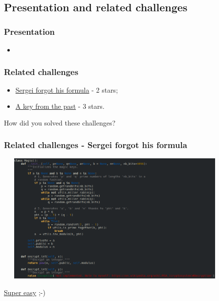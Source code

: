 \documentclass[]{beamer}
\begin{document}
\subsection{Presentation and related challenges}
\begin{frame}
\frametitle{Presentation}
\begin{itemize}
    \item
\end{itemize}
\end{frame}

\begin{frame}
\frametitle{Related challenges}
\begin{itemize}
    \item \href{https://github.com/cscluxembourg/vestatech/blob/master/challenges/Sergei_forgot_his_formula/wip.py}{Sergei forgot his formula} - 2 stars;
    \item \href{https://github.com/cscluxembourg/vestatech/tree/master/challenges/A_key_from_the_past}{A key from the past} - 3 stars.
\end{itemize}
\bigskip
How did you solved these challenges?
\end{frame}

\begin{frame}
\frametitle{Related challenges - Sergei forgot his formula}
\begin{center}
    \includegraphics[height=6.5cm, width=12.0cm]{./images/RSA-algo-key-generation.png}
\end{center}
\href{https://en.wikipedia.org/wiki/RSA_(cryptosystem)\#Decryption}{Super easy} ;-)
\end{frame}
\end{document}
